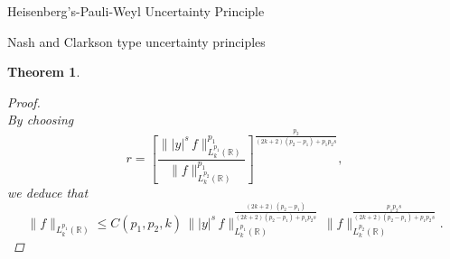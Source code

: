 \documentclass[12pt,a4paper,reqno]{amsproc}
\newtheorem{theorem}{Theorem}[section]
\theoremstyle{definition}
\theoremstyle{remark}
\numberwithin{equation}{section}
\begin{document}
\begin{subsection}{Heisenberg's-Pauli-Weyl Uncertainty Principle}
\begin{subsection}{Nash and Clarkson type uncertainty principles}
\begin{theorem}
\begin{proof}
\begin{equation*}
\end{equation*}
By choosing
\begin{equation*}
    r= \left[\frac{\||y|^s\,f\|^{p_1}_{L_k^{p_1}(\mathbb{R})}}{\|f\|^{p_1}_{L_k^{p_2}(\mathbb{R})}}\right]^{\frac{p_2}{(2k+2)(p_2-p_1)+p_1p_2s}},
\end{equation*}
we deduce that
 \begin{equation*}
    \|f\|_{L_k^{p_1}(\mathbb{R})} \le C(p_1,p_2,k)\, \||y|^s\,f\|^{\frac{(2k+2)\,(p_2-p_1)}{(2k+2)(p_2-p_1)+p_1p_2s}}_{L_k^{p_1}(\mathbb{R})}\, \|f\|_{L_k^{p_2}(\mathbb{R})}^{\frac{p_1p_2s}{(2k+2)(p_2-p_1)+p_1p_2s}}.
\end{equation*}   
\end{proof}    
\end{theorem}
\end{subsection}
\end{subsection}
\end{document}
